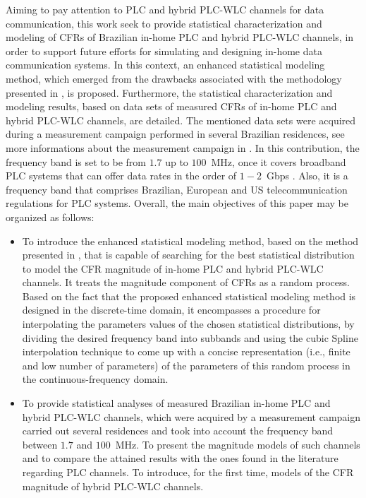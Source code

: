 \documentclass[journal]{IEEEtran}
\begin{document}
Aiming to pay attention to \ac{PLC} and hybrid \ac{PLC}-\ac{WLC} channels for data communication, this work seek to provide statistical characterization and modeling of \acp{CFR} of Brazilian in-home \ac{PLC} and hybrid \ac{PLC}-\ac{WLC} channels, in order to support future efforts for simulating and designing in-home data communication systems. In this context, an enhanced statistical modeling method, which emerged from the drawbacks associated with the methodology presented in \cite{Luis:AI,Luis:doc}, is proposed. Furthermore, the statistical characterization and modeling results, based on data sets of measured \acp{CFR} of in-home \ac{PLC} and hybrid \ac{PLC}-\ac{WLC} channels, are detailed.
The mentioned data sets were acquired during a measurement campaign performed in several Brazilian residences, see more informations about the measurement campaign in \cite{Thiago:Characterization,thiago:hyb,thiago:hyb2,thiago:doc}. In this contribution, the frequency band is set to be from $1.7$ up to $100$~MHz, once it covers broadband \ac{PLC} systems that can offer data rates in the order of $1-2$~Gbps \cite{Galli:indoor,Thiago:Characterization}. Also, it is a frequency band that comprises Brazilian, European and US telecommunication regulations for \ac{PLC} systems. Overall, the main objectives of this paper may be organized as follows:
\begin{itemize}
	\item To introduce the enhanced statistical modeling method, based on the method presented in \cite{Luis:AI,Luis:doc}, that is capable of searching for the best statistical distribution to model the \ac{CFR} magnitude of in-home \ac{PLC} and hybrid \ac{PLC}-\ac{WLC} channels. It treats the magnitude component of \acp{CFR} as a random process. Based on the fact that the proposed enhanced statistical modeling method is designed in the discrete-time domain, it encompasses a procedure for interpolating the parameters values of the chosen statistical distributions, by dividing the desired frequency band into subbands and using the cubic Spline interpolation technique to come up with a concise representation (i.e., finite and low number of parameters) of the parameters of this random process in the continuous-frequency domain.
	\item To provide statistical analyses of measured Brazilian in-home \ac{PLC} and hybrid \ac{PLC}-\ac{WLC} channels, which were acquired by a measurement campaign carried out several residences and took into account the frequency band between $1.7$ and $100$~MHz. To present the magnitude models of such channels and to compare the attained results with the ones found in the literature regarding \ac{PLC} channels. To introduce, for the first time, models of the \ac{CFR} magnitude of hybrid \ac{PLC}-\ac{WLC} channels. 
\end{itemize}
\end{document}
